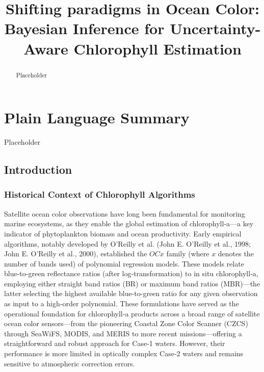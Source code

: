 \documentclass[
]{agujournal2019}
\begin{document}
\title{Shifting paradigms in Ocean Color: Bayesian Inference for
Uncertainty-Aware Chlorophyll Estimation}



\begin{abstract}
Placeholder
\end{abstract}

\section*{Plain Language Summary}
Placeholder




\subsection{Introduction}\label{introduction}

\subsubsection{Historical Context of Chlorophyll
Algorithms}\label{historical-context-of-chlorophyll-algorithms}

Satellite ocean color observations have long been fundamental for
monitoring marine ecosystems, as they enable the global estimation of
chlorophyll‑a---a key indicator of phytoplankton biomass and ocean
productivity. Early empirical algorithms, notably developed by O'Reilly
et al. (John E. O'Reilly et al., 1998; John E. O'Reilly et al., 2000),
established the \(OCx\) family (where \(x\) denotes the number of bands
used) of polynomial regression models. These models relate blue-to-green
reflectance ratios (after log‑transformation) to in situ chlorophyll‑a,
employing either straight band ratios (BR) or maximum band ratios
(MBR)---the latter selecting the highest available blue-to-green ratio
for any given observation as input to a high‑order polynomial. These
formulations have served as the operational foundation for chlorophyll‑a
products across a broad range of satellite ocean color sensors---from
the pioneering Coastal Zone Color Scanner (CZCS) through SeaWiFS, MODIS,
and MERIS to more recent missions---offering a straightforward and
robust approach for Case‑1 waters. However, their performance is more
limited in optically complex Case‑2 waters and remains sensitive to
atmospheric correction errors.
\end{document}
